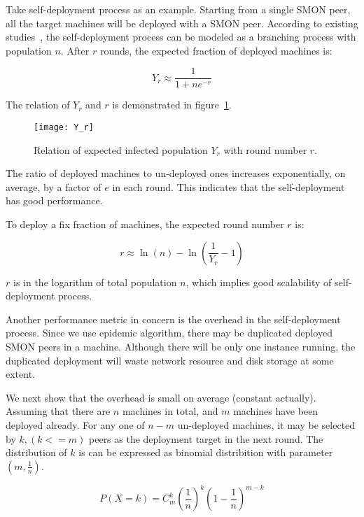 Take self-deployment process as an example. Starting from a
single SMON peer, all the target machines will be deployed
with a SMON peer.  According to existing
studies~\cite{Eugster2004}, the self-deployment process can
be modeled as a branching process with population $n$. After
$r$ rounds, the expected fraction of deployed machines is:

\begin{equation*}
Y_r \approx \frac{1}{1+ne^{-r}}
\end{equation*}

The relation of $Y_r$ and $r$ is demonstrated in
figure~\ref{fig:yr}.

\begin{figure}
\centering
\texttt{[image: Y\_r]}
\caption{Relation of expected infected population $Y_r$ with
round number $r$.}
\label{fig:yr}
\end{figure}


The ratio of deployed machines to un-deployed ones increases
exponentially, on average, by a factor of $e$ in each round.
This indicates that the self-deployment has good
performance.

To deploy a fix fraction of machines, the expected round
number $r$ is:

\begin{equation*}
r \approx \ln(n) - \ln(\frac{1}{Y_r} - 1)
\end{equation*}

$r$ is in the logarithm of total population $n$, which
implies good scalability of self-deployment process.


Another performance metric in concern is the overhead in
the self-deployment process. Since we use epidemic
algorithm, there may be duplicated deployed SMON peers in a
machine. Although there will be only one instance running,
the duplicated deployment will waste network resource and
disk storage at some extent.

We next show that the overhead is small on average (constant
actually). Assuming that there are $n$ machines in total,
and $m$ machines have been deployed already. For any one of
$n-m$ un-deployed machines, it may be selected by $k, (k <=
m)$ peers as the deployment target in the next round.  The
distribution of $k$ is can be expressed as binomial
distribition with parameter $(m, \frac{1}{n})$.

\begin{equation*}
P(X=k) = C_m^k (\frac{1}{n})^k (1 - \frac{1}{n})^{m - k}
\end{equation*}

